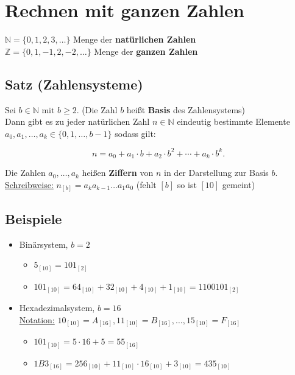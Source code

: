 \section{Rechnen mit ganzen Zahlen}

$\mathbb{N} = \{0, 1, 2, 3,  \dots \}$ Menge der \textbf{natürlichen Zahlen}\\
$\mathbb{Z} = \{0, 1, -1, 2, -2,  \dots \}$ Menge der \textbf{ganzen Zahlen}


\subsection[Zahlensysteme]{Satz (Zahlensysteme)}

	Sei $b\in\mathbb{N}\text{ mit }b\geq 2$. 
	(Die Zahl $b$ heißt \textbf{Basis} des Zahlensystems)\\
	Dann gibt es zu jeder natürlichen Zahl $n\in\mathbb{N}$ eindeutig bestimmte Elemente 
	$a_0,a_1,\dots,a_k\in\{0,1,\dots,b-1\}$ sodass gilt:

	\[
		n = a_0 + a_1 \cdot b + a_2 \cdot b^2 + \cdots + a_k \cdot b^k.
	\]

	Die Zahlen $a_0,\dots,a_k$ heißen \textbf{Ziffern} von $n$ 
	in der Darstellung zur Basis $b$.\\
	\underline{Schreibweise:} $n_{[b]}=a_k a_{k-1}\dots a_1 a_0$ 
	(fehlt $[b]$ so ist $[10]$ gemeint)


\subsection{Beispiele}

	\begin{itemize}
	
		\item Binärsystem, $b=2$

		\begin{itemize}
		
			\item $5_{[10]}=101_{[2]}$
			\item $101_{[10]}=64_{[10]}+32_{[10]}+4_{[10]}+1_{[10]}=1100101_{[2]}$
		
		\end{itemize}
		
		\item Hexadezimalsystem, $b=16$\\
		\underline{Notation:} 
		$10_{[10]}=A_{[16]},11_{[10]}=B_{[16]},\dots,15_{[10]}=F_{[16]}$
		
		\begin{itemize}
		
			\item $101_{[10]}=5\cdot 16+5=55_{[16]}$
			\item $1B3_{[16]}=256_{[10]}+11_{[10]}\cdot 16_{[10]}+3_{[10]}=435_{[10]}$
			
		\end{itemize}
	
	\end{itemize}
	

